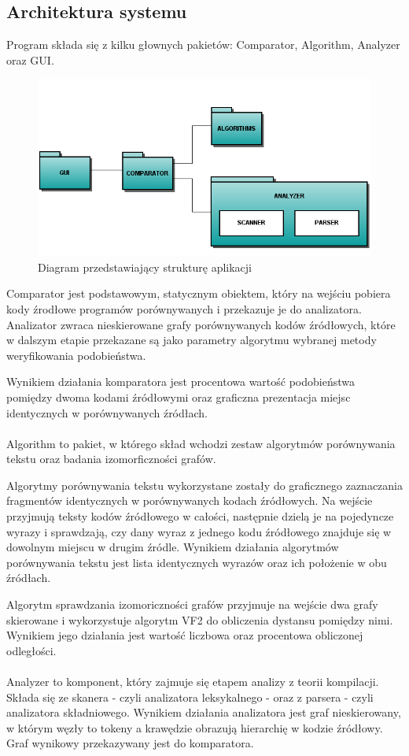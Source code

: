 \documentclass[a4paper,12pt]{article}
\begin{document}
\subsection{Architektura systemu}

Program składa się z kilku głownych pakietów: Comparator, Algorithm, Analyzer oraz GUI.

\begin{figure}[!h]
\centering
\includegraphics[scale=0.65]{gfx/packagediagram.png}
\caption{Diagram przedstawiający strukturę aplikacji}
\end{figure}

Comparator jest podstawowym, statycznym obiektem, który na wejściu pobiera kody źrodłowe programów porównywanych i przekazuje je do analizatora. Analizator zwraca nieskierowane grafy porównywanych kodów źródłowych, które w dalszym etapie przekazane są jako parametry algorytmu wybranej metody weryfikowania podobieństwa. 

Wynikiem działania komparatora jest procentowa wartość podobieństwa pomiędzy dwoma kodami źródłowymi oraz graficzna prezentacja miejsc identycznych w porównywanych źródłach.
\\ \\
Algorithm to pakiet, w którego skład wchodzi zestaw algorytmów porównywania tekstu oraz badania izomorficzności grafów. 

Algorytmy porównywania tekstu wykorzystane zostały do graficznego zaznaczania fragmentów identycznych w porównywanych kodach źródłowych. Na wejście przyjmują teksty kodów źródłowego w całości, następnie dzielą je na pojedyncze wyrazy i sprawdzają, czy dany wyraz z jednego kodu źródłowego znajduje się w dowolnym miejscu w drugim źródle. Wynikiem działania algorytmów porównywania tekstu jest lista identycznych wyrazów oraz ich położenie w obu źródłach.

Algorytm sprawdzania izomoriczności grafów przyjmuje na wejście dwa grafy skierowane i wykorzystuje algorytm VF2 do obliczenia dystansu pomiędzy nimi. Wynikiem jego działania jest wartość liczbowa oraz procentowa obliczonej odległości.
\\ \\
Analyzer to komponent, który zajmuje się etapem analizy z teorii kompilacji. Składa się ze skanera - czyli analizatora leksykalnego - oraz z parsera - czyli analizatora składniowego. Wynikiem działania analizatora jest graf nieskierowany, w którym węzły to tokeny a krawędzie obrazują hierarchię w kodzie źródłowy. Graf wynikowy przekazywany jest do komparatora.
\end{document}
